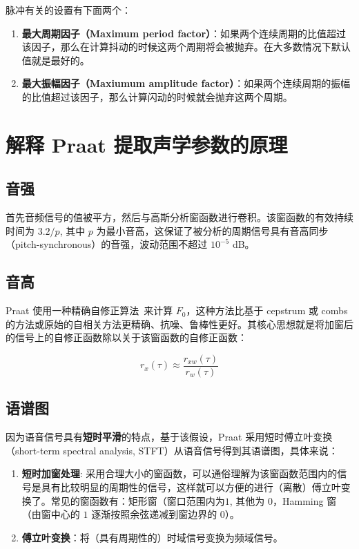 脉冲有关的设置有下面两个：

\begin{enumerate}
  \item \textbf{最大周期因子（Maximum period factor）}：如果两个连续周期的比值超过该因子，那么在计算抖动的时候这两个周期将会被抛弃。在大多数情况下默认值就是最好的。
  \item \textbf{最大振幅因子（Maxiumum amplitude factor）}：如果两个连续周期的振幅的比值超过该因子，那么计算闪动的时候就会抛弃这两个周期。
\end{enumerate}

\section{解释 Praat 提取声学参数的原理}
\subsection{音强}
首先音频信号的值被平方，然后与高斯分析窗函数进行卷积。该窗函数的有效持续时间为 $3.2 / p$, 其中 $p$ 为最小音高，这保证了被分析的周期信号具有音高同步（pitch-synchronous）的音强，波动范围不超过 $10^{-5}$ dB。

\subsection{音高}
Praat 使用一种精确自修正算法~\cite{pitch_algo}来计算 $F_0$，这种方法比基于 cepstrum 或 combs 的方法或原始的自相关方法更精确、抗噪、鲁棒性更好。其核心思想就是将加窗后的信号上的自修正函数除以关于该窗函数的自修正函数：

\begin{equation}
  r_x(\tau) \approx \frac{r_{xw}(\tau)}{r_w(\tau)}
\end{equation}

\subsection{语谱图}
因为语音信号具有\textbf{短时平滑}的特点，基于该假设，Praat 采用短时傅立叶变换（short-term spectral analysis, STFT）从语音信号得到其语谱图，具体来说：

\begin{enumerate}
  \item \textbf{短时加窗处理}: 采用合理大小的窗函数，可以通俗理解为该窗函数范围内的信号是具有比较明显的周期性的信号，这样就可以方便的进行（离散）傅立叶变换了。常见的窗函数有：矩形窗（窗口范围内为$1$, 其他为 $0$，Hamming 窗（由窗中心的 $1$ 逐渐按照余弦递减到窗边界的 $0$）。
  \item \textbf{傅立叶变换}：将（具有周期性的）时域信号变换为频域信号。
\end{enumerate}


